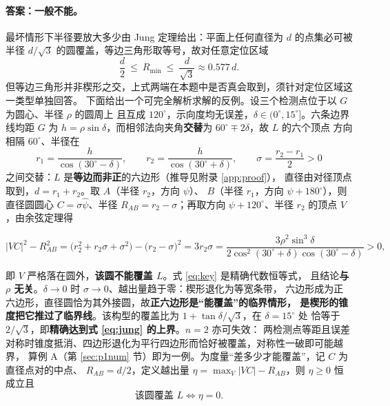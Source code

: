 \documentclass[withoutpreface, bwprint]{cumcmthesis}
\begin{document}
\paragraph{答案：一般不能。}
最坏情形下半径要放大多少由 Jung 定理\cite{jung}给出：平面上任何直径为 $d$ 的点集必可被
半径 $d/\sqrt3$ 的圆覆盖，等边三角形取等号，故对任意定位区域
\begin{equation}
  \label{eq:jung}
  \frac{d}{2}\ \le\ R_{\min}\ \le\ \frac{d}{\sqrt3}\approx 0.577\,d .
\end{equation}
但等边三角形并非楔形之交，上式两端在本题中是否真会取到，须针对定位区域这一类型单独回答。
下面给出一个可完全解析求解的反例。设三个检测点位于以 $G$ 为圆心、半径 $\rho$ 的圆周上
且互成 $120^\circ$，示向度均无误差，$\delta\in(0^\circ,15^\circ]$。六条边界线均距 $G$ 为
$h=\rho\sin\delta$，而相邻法向夹角\textbf{交替}为 $60^\circ\mp2\delta$，故 $L$ 的六个顶点
方向相隔 $60^\circ$、半径在
\begin{equation}
  \label{eq:r1r2}
  r_1=\frac{h}{\cos(30^\circ-\delta)},\qquad
  r_2=\frac{h}{\cos(30^\circ+\delta)},\qquad
  \sigma=\frac{r_2-r_1}{2}>0
\end{equation}
之间交替：$L$ 是\textbf{等边而非正}的六边形（推导见附录 \ref{app:proof}），
直径由对径顶点取到，$d=r_1+r_2$。取 $A$（半径 $r_2$，方向 $\psi$）、
$B$（半径 $r_1$，方向 $\psi+180^\circ$），则直径圆圆心 $C=\sigma\hat\psi$、半径
$R_{AB}=r_2-\sigma$；再取方向 $\psi+120^\circ$、半径 $r_2$ 的顶点 $V$，由余弦定理得

\begin{equation}
  \label{eq:key}
  |VC|^2-R_{AB}^2=\bigl(r_2^2+r_2\sigma+\sigma^2\bigr)-\bigl(r_2-\sigma\bigr)^2=3r_2\sigma
  =\frac{3\rho^2\sin^3\delta}{2\cos^2(30^\circ+\delta)\cos(30^\circ-\delta)}>0 ,
\end{equation}

即 $V$ 严格落在圆外，\textbf{该圆不能覆盖 $L$}。式 \eqref{eq:key} 是精确代数恒等式，
且结论\textbf{与 $\rho$ 无关}。$\delta\to0$ 时 $\sigma\to0$、越出量趋于零：楔形退化为等宽条带，
六边形成为正六边形，直径圆恰为其外接圆，故\textbf{正六边形是“能覆盖”的临界情形，
是楔形的锥度把它推过了临界线}。该构型的覆盖比为 $1+\tan\delta/\sqrt3$，在 $\delta=15^\circ$ 处
恰等于 $2/\sqrt3$，即\textbf{精确达到式 \eqref{eq:jung} 的上界}。$n=2$ 亦可失效：
两检测点等距且误差对称时锥度抵消、四边形退化为平行四边形而恰好被覆盖，对称性一破即可能越界，
算例 A（第 \ref{sec:p1num} 节）即为一例。为度量“差多少才能覆盖”，记 $C$ 为直径点对的中点、
$R_{AB}=d/2$，定义越出量 $\eta=\max_{V}\lvert VC\rvert-R_{AB}$，则 $\eta\ge0$ 恒成立且
\begin{equation}
  \label{eq:etazero}
  \text{该圆覆盖 }L\iff\eta=0 .
\end{equation}
\end{document}
